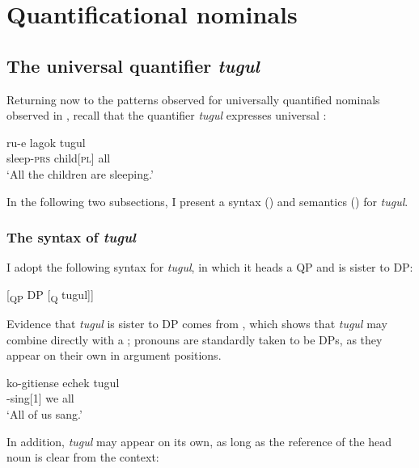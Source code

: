 \documentclass[output=paper]{LSP/langsci}
\begin{document}
\section{Quantificational nominals}
\label{sec:landman:qnominals}

\subsection{The universal quantifier \textit{tugul}}
Returning now to the patterns observed for universally quantified nominals observed in , recall that the quantifier \textit{tugul} expresses universal : 

\begin{exe}
     \gll ru-e lagok tugul \\
          sleep-\textsc{prs} child[\textsc{pl}] all\\ 
     \glt ‘All the children are sleeping.’
\end{exe}

\noindent In the following two subsections, I present a syntax () and semantics () for \textit{tugul}.

\subsubsection{The syntax of \textit{tugul}}
\label{sec:landman:tugulsyn}
\noindent I adopt the following syntax for \textit{tugul}, in which it heads a QP and is sister to DP:  

\ea \label{ex:landman:tugultree}
[\textsubscript{QP} DP [\textsubscript{Q} tugul]]  %
\z

\noindent Evidence that \textit{tugul} is sister to DP comes from , which shows that \textit{tugul} may combine directly with a ; pronouns are standardly taken to be DPs, as they appear on their own in argument positions.

\ea \label{ex:landman:tugulpronoun}
    \gll ko-gitiense echek tugul\\ 
	     \pst-sing[1\pl] we all\\ 
    \glt ‘All of us sang.’
\z

\noindent In addition, \textit{tugul} may appear on its own, as long as the reference of the head noun is clear from the context:
\end{document}
